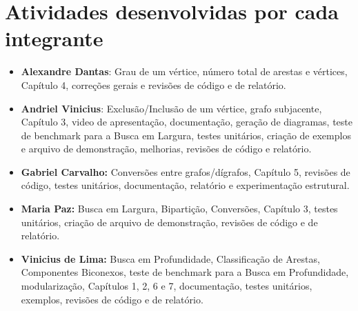 \chapter{Atividades desenvolvidas por cada integrante}
\label{appn:A}

\begin{itemize}
  \item \textbf{Alexandre Dantas}: Grau de um vértice, número total de
    arestas e vértices, Capítulo 4, correções gerais e revisões de
    código e de relatório.
  \item \textbf{Andriel Vinicius}: Exclusão/Inclusão de um vértice,
    grafo subjacente, Capítulo 3, video de apresentação,
    documentação, geração de diagramas, teste de benchmark para a
    Busca em Largura, testes unitários, criação de exemplos e arquivo de demonstração,
    melhorias, revisões de código e relatório.
  \item \textbf{Gabriel Carvalho:} Conversões entre grafos/dígrafos,
    Capítulo 5, revisões de código, testes unitários, documentação, relatório e
    experimentação estrutural.
  \item \textbf{Maria Paz:} Busca em Largura, Bipartição, Conversões, Capítulo 3,
    testes unitários, criação de arquivo de demonstração, revisões de código e de relatório.
  \item \textbf{Vinicius de Lima:} Busca em Profundidade,
    Classificação de Arestas, Componentes Biconexos, teste de
    benchmark para a Busca em Profundidade, modularização, Capítulos 1, 2, 6 e 7,
    documentação, testes unitários, exemplos, revisões de código e de relatório.
\end{itemize}
